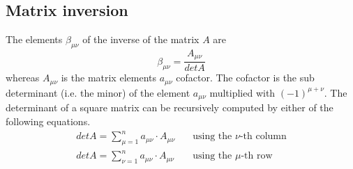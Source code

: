 \documentclass[10pt]{report}
\begin{document}
\subsection{Matrix inversion}

The elements $\beta_{\mu\nu}$ of the inverse of the matrix $A$ are
\begin{equation}
\beta_{\mu\nu} = \frac{A_{\mu\nu}}{det A}
\end{equation}
whereas $A_{\mu\nu}$ is the matrix elements $a_{\mu\nu}$ cofactor.
The cofactor is the sub determinant (i.e. the minor) of the element
$a_{\mu\nu}$ multiplied with $(-1)^{\mu + \nu}$.  The determinant of a
square matrix can be recursively computed by either of the following
equations.
\begin{align}
det A = \sum_{\mu = 1}^{n} a_{\mu\nu}\cdot A_{\mu\nu}
\quad &\text{using the $\nu$-th column}\\
det A = \sum_{\nu = 1}^{n} a_{\mu\nu}\cdot A_{\mu\nu}
\quad &\text{using the $\mu$-th row}
\end{align}
\end{document}
